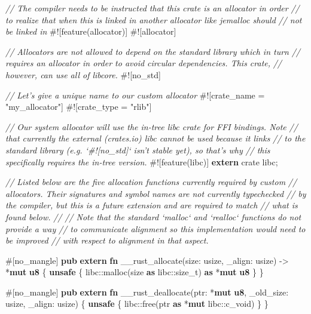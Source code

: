 \documentclass[a4paper,]{book}
\newenvironment{Shaded}{\begin{snugshade}}{\end{snugshade}}
\newcommand{\KeywordTok}[1]{\textcolor[rgb]{0.13,0.29,0.53}{\textbf{{#1}}}}
\newcommand{\StringTok}[1]{\textcolor[rgb]{0.31,0.60,0.02}{{#1}}}
\newcommand{\CommentTok}[1]{\textcolor[rgb]{0.56,0.35,0.01}{\textit{{#1}}}}
\newcommand{\OtherTok}[1]{\textcolor[rgb]{0.56,0.35,0.01}{{#1}}}
\newcommand{\NormalTok}[1]{{#1}}
\begin{document}
\begin{Shaded}
\begin{Highlighting}[]
\CommentTok{// The compiler needs to be instructed that this crate is an allocator in order}
\CommentTok{// to realize that when this is linked in another allocator like jemalloc should}
\CommentTok{// not be linked in}
\NormalTok{#![feature(allocator)]}
\NormalTok{#![allocator]}

\CommentTok{// Allocators are not allowed to depend on the standard library which in turn}
\CommentTok{// requires an allocator in order to avoid circular dependencies. This crate,}
\CommentTok{// however, can use all of libcore.}
\NormalTok{#![no_std]}

\CommentTok{// Let's give a unique name to our custom allocator}
\NormalTok{#![crate_name = }\StringTok{"my_allocator"}\NormalTok{]}
\NormalTok{#![crate_type = }\StringTok{"rlib"}\NormalTok{]}

\CommentTok{// Our system allocator will use the in-tree libc crate for FFI bindings. Note}
\CommentTok{// that currently the external (crates.io) libc cannot be used because it links}
\CommentTok{// to the standard library (e.g. `#![no_std]` isn't stable yet), so that's why}
\CommentTok{// this specifically requires the in-tree version.}
\NormalTok{#![feature(libc)]}
\KeywordTok{extern} \NormalTok{crate libc;}

\CommentTok{// Listed below are the five allocation functions currently required by custom}
\CommentTok{// allocators. Their signatures and symbol names are not currently typechecked}
\CommentTok{// by the compiler, but this is a future extension and are required to match}
\CommentTok{// what is found below.}
\CommentTok{//}
\CommentTok{// Note that the standard `malloc` and `realloc` functions do not provide a way}
\CommentTok{// to communicate alignment so this implementation would need to be improved}
\CommentTok{// with respect to alignment in that aspect.}

\OtherTok{#[}\NormalTok{no_mangle}\OtherTok{]}
\KeywordTok{pub} \KeywordTok{extern} \KeywordTok{fn} \NormalTok{__rust_allocate(size: usize, _align: usize) -> *}\KeywordTok{mut} \KeywordTok{u8} \NormalTok{\{}
    \KeywordTok{unsafe} \NormalTok{\{ libc::malloc(size }\KeywordTok{as} \NormalTok{libc::size_t) }\KeywordTok{as} \NormalTok{*}\KeywordTok{mut} \KeywordTok{u8} \NormalTok{\}}
\NormalTok{\}}

\OtherTok{#[}\NormalTok{no_mangle}\OtherTok{]}
\KeywordTok{pub} \KeywordTok{extern} \KeywordTok{fn} \NormalTok{__rust_deallocate(ptr: *}\KeywordTok{mut} \KeywordTok{u8}\NormalTok{, _old_size: usize, _align: usize) \{}
    \KeywordTok{unsafe} \NormalTok{\{ libc::free(ptr }\KeywordTok{as} \NormalTok{*}\KeywordTok{mut} \NormalTok{libc::c_void) \}}
\NormalTok{\}}


\end{Highlighting}
\end{Shaded}
\end{document}
